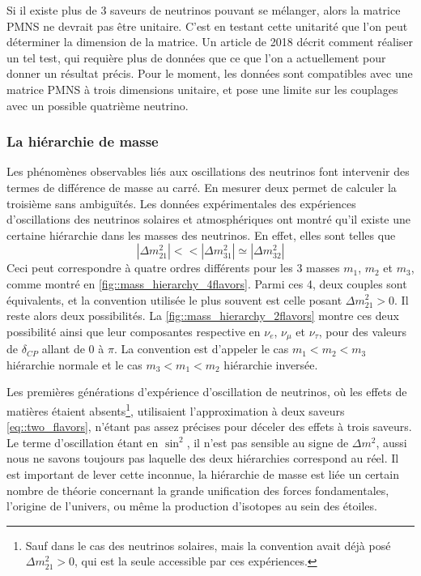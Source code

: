 	            Si il existe plus de 3 saveurs de neutrinos pouvant se mélanger, alors la matrice PMNS ne devrait pas être unitaire. C'est en testant cette unitarité que l'on peut déterminer la dimension de la matrice. Un article de 2018\cite{Qian2013} décrit comment réaliser un tel test, qui requière plus de données que ce que l'on a actuellement pour donner un résultat précis. Pour le moment, les données sont compatibles avec une matrice PMNS à trois dimensions unitaire, et pose une limite sur les couplages avec un possible quatrième neutrino.
	            
	        
		        \subsubsection{La hiérarchie de masse}\label{sec::hierarchy}
		        
	            Les phénomènes observables liés aux oscillations des neutrinos font intervenir des termes de différence de masse au carré. En mesurer deux permet de calculer la troisième sans ambiguïtés. Les données expérimentales des expériences d'oscillations des neutrinos solaires et atmosphériques ont montré qu'il existe une certaine hiérarchie dans les masses des neutrinos. En effet, elles sont telles que
	            \begin{equation}\label{eq::mass_hierarchy}
	            	|\Delta m^2_{21}| <<|\Delta m^2_{31}| \simeq |\Delta m^2_{32}| 
	            \end{equation}
	            Ceci peut correspondre à quatre ordres différents pour les 3 masses $m_1$, $m_2$ et $m_3$, comme montré en \autoref{fig::mass_hierarchy_4flavors}. Parmi ces 4, deux couples sont équivalents\cite{pdg2018}, et la convention utilisée le plus souvent est celle posant $\Delta m^2_{21} > 0$. Il reste alors deux possibilités. La \autoref{fig::mass_hierarchy_2flavors} montre ces deux possibilité ainsi que leur composantes respective en $\nu_e$, $\nu_{\mu}$ et $\nu_{\tau}$, pour des valeurs de $\delta_{CP}$ allant de 0 à $\pi$\cite{Qian2015}. La convention est d'appeler le cas $m_1 < m_2 < m_3$ hiérarchie normale et le cas $m_3 < m_1 < m_2$ hiérarchie inversée.
	            
	            Les premières générations d'expérience d'oscillation de neutrinos, où les effets de matières étaient absents\footnote{Sauf dans le cas des neutrinos solaires, mais la convention avait déjà posé $\Delta m^2_{21} > 0$, qui est la seule accessible par ces expériences.}, utilisaient l'approximation à deux saveurs \eqref{eq::two_flavors}, n'étant pas assez précises pour déceler des effets à trois saveurs. Le terme d'oscillation étant en $\sin^2$, il n'est pas sensible au signe de $\Delta m^2$, aussi nous ne savons toujours pas laquelle des deux hiérarchies correspond au réel. Il est important de lever cette inconnue, la hiérarchie de masse est liée  un certain nombre de théorie concernant la grande unification des forces fondamentales, l'origine de l'univers, ou même la production d'isotopes au sein des étoiles\cite{KH-website}.
	            
